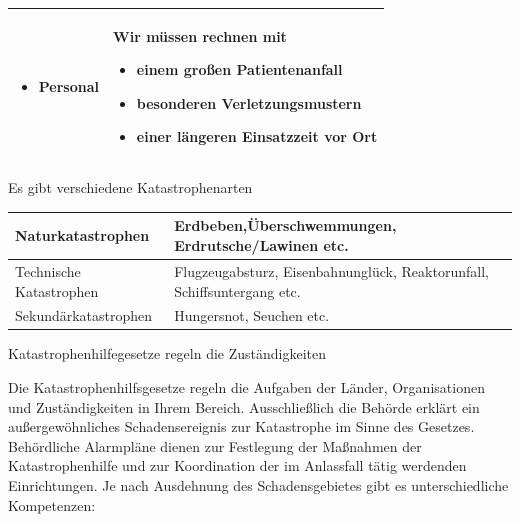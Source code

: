 \documentclass{article}
\begin{document}
\begin{center}
\begin{supertabular}{|m{6.649cm}|m{6.651cm}|}
\begin{itemize}
\item Personal

\end{itemize}
 &
Wir m\"ussen rechnen mit

\begin{itemize}
\item einem gro{\ss}en Patientenanfall

\item besonderen Verletzungsmustern

\item einer l\"angeren Einsatzzeit vor Ort

\end{itemize}
\\\hline
\end{supertabular}
\end{center}
Es gibt verschiedene Katastrophenarten

\begin{center}
\tablehead{}\begin{supertabular}{|m{6.649cm}|m{6.651cm}|}
\hline
Naturkatastrophen

 &
Erdbeben,\"Uberschwemmungen, Erdrutsche/Lawinen etc.

\\\hline
Technische Katastrophen

 &
Flugzeugabsturz, Eisenbahnungl\"uck, Reaktor\-unfall, Schiffs\-untergang
etc.

\\\hline
Sekund\"arkatastrophen

 &
Hungersnot, Seuchen etc.

\\\hline
\end{supertabular}
\end{center}
Katastrophenhilfegesetze regeln die Zust\"andigkeiten

Die Katastrophenhilfsgesetze regeln die Aufgaben der L\"ander,
Organisationen und Zust\"andigkeiten in Ihrem Bereich.
Ausschlie{\ss}lich die Beh\"orde erkl\"art ein au{\ss}ergew\"ohnliches
Schadensereignis zur Katastrophe im Sinne des Gesetzes. Beh\"ordliche
Alarmpl\"ane dienen zur Festlegung der Ma{\ss}nahmen der
Katastrophenhilfe und zur Koordination der im Anlassfall t\"atig
werdenden Einrichtungen. Je nach Ausdehnung des Schadensgebietes gibt
es unterschiedliche Kompetenzen:
\end{document}

